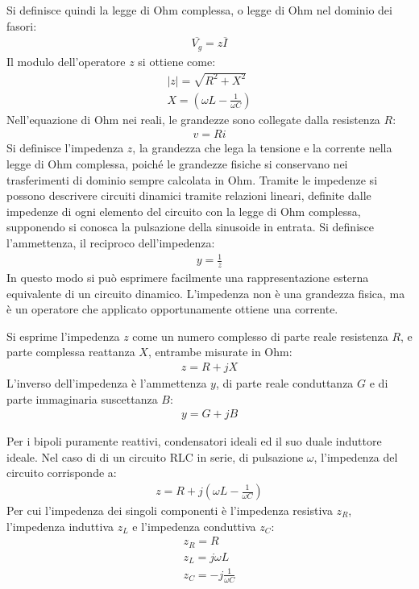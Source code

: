 \documentclass{article}
\numberwithin{equation}{subsection}
\begin{document}
Si definisce quindi la legge di Ohm complessa, o legge di Ohm nel dominio dei fasori:
\begin{gather*}
    \overline{V_g}=z\overline{I}
\end{gather*}
Il modulo dell'operatore $z$ si ottiene come:
\begin{gather*}
    |z|=\displaystyle\sqrt{R^2+X^2}\\
    X=\left(\omega L-\displaystyle\frac{1}{\omega C}\right)
\end{gather*}
Nell'equazione di Ohm nei reali, le grandezze sono collegate dalla resistenza $R$:
\begin{gather*}
    v=Ri
\end{gather*}
Si definisce l'impedenza $z$, la grandezza che lega la tensione e la corrente nella legge di Ohm complessa, poiché le grandezze fisiche si conservano nei trasferimenti di 
dominio sempre calcolata in Ohm. 
Tramite le impedenze si possono descrivere circuiti dinamici tramite relazioni lineari, definite dalle impedenze di ogni elemento del circuito con la legge di Ohm complessa, 
supponendo si conosca la pulsazione della sinusoide in entrata. 
Si definisce l'ammettenza, il reciproco dell'impedenza:
\begin{gather*}
    y=\displaystyle\frac{1}{z}
\end{gather*}
In questo modo si può esprimere facilmente una rappresentazione esterna equivalente di un circuito dinamico. 
L'impedenza non è una grandezza fisica, ma è un operatore che applicato opportunamente ottiene una corrente. 


Si esprime l'impedenza $z$ come un numero complesso di parte reale resistenza $R$, e parte complessa reattanza $X$, entrambe misurate in Ohm:
\begin{gather*}
    z=R+jX
\end{gather*}
L'inverso dell'impedenza è l'ammettenza $y$, di parte reale conduttanza $G$ e di parte immaginaria suscettanza $B$:
\begin{gather*}
    y=G+jB
\end{gather*}

Per i bipoli puramente reattivi, condensatori ideali ed il suo duale induttore ideale. 
Nel caso di di un circuito RLC in serie, di pulsazione $\omega$, l'impedenza del circuito corrisponde a:
\begin{gather*}
    z=R+j\left(\displaystyle \omega L-\frac{1}{\omega C}\right)
\end{gather*}
Per cui l'impedenza dei singoli componenti è l'impedenza resistiva $z_R$, l'impedenza induttiva $z_L$ e l'impedenza conduttiva $z_C$:
\begin{gather*}
    z_R=R\\
    z_L=j\omega L\\
    z_C=\displaystyle -j\frac{1}{\omega C}
\end{gather*}
\end{document}

